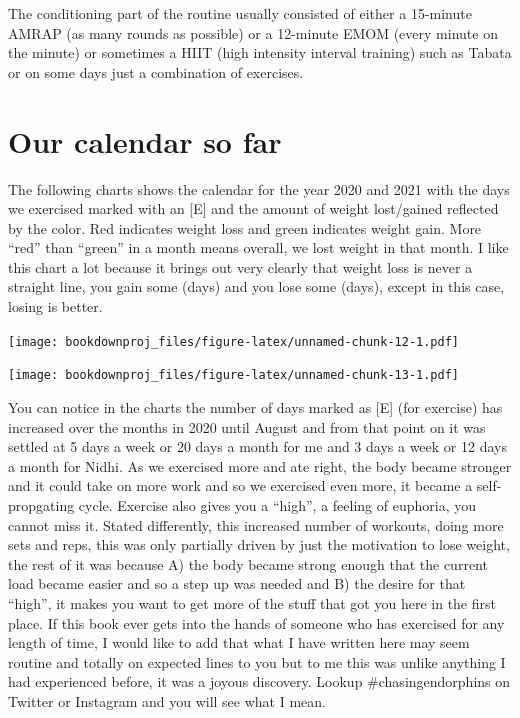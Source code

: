 \documentclass[
  oneside]{book}
\begin{document}
The conditioning part of the routine usually consisted of either a 15-minute AMRAP (as many rounds as possible) or a 12-minute EMOM (every minute on the minute) or sometimes a HIIT (high intensity interval training) such as Tabata or on some days just a combination of exercises.

\hypertarget{our-calendar-so-far}{%
\section{Our calendar so far}\label{our-calendar-so-far}}

The following charts shows the calendar for the year 2020 and 2021 with the days we exercised marked with an {[}E{]} and the amount of weight lost/gained reflected by the color. Red indicates weight loss and green indicates weight gain. More ``red'' than ``green'' in a month means overall, we lost weight in that month. I like this chart a lot because it brings out very clearly that weight loss is never a straight line, you gain some (days) and you lose some (days), except in this case, losing is better.

\texttt{[image: bookdownproj\_files/figure-latex/unnamed-chunk-12-1.pdf]}

\texttt{[image: bookdownproj\_files/figure-latex/unnamed-chunk-13-1.pdf]}

You can notice in the charts the number of days marked as {[}E{]} (for exercise) has increased over the months in 2020 until August and from that point on it was settled at 5 days a week or 20 days a month for me and 3 days a week or 12 days a month for Nidhi. As we exercised more and ate right, the body became stronger and it could take on more work and so we exercised even more, it became a self-propgating cycle. Exercise also gives you a ``high'', a feeling of euphoria, you cannot miss it. Stated differently, this increased number of workouts, doing more sets and reps, this was only partially driven by just the motivation to lose weight, the rest of it was because A) the body became strong enough that the current load became easier and so a step up was needed and B) the desire for that ``high'', it makes you want to get more of the stuff that got you here in the first place. If this book ever gets into the hands of someone who has exercised for any length of time, I would like to add that what I have written here may seem routine and totally on expected lines to you but to me this was unlike anything I had experienced before, it was a joyous discovery. Lookup \#chasingendorphins on Twitter or Instagram and you will see what I mean.
\end{document}
